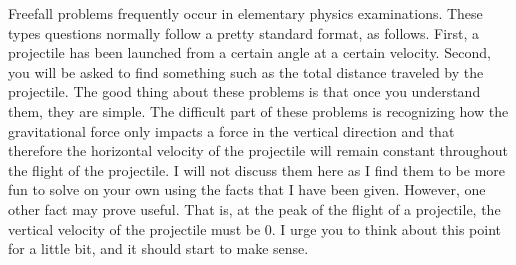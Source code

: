 Freefall problems frequently occur in elementary physics examinations. These types questions normally follow a pretty standard format, as follows. First, a projectile has been launched from a certain angle at a certain velocity. Second, you will be asked to find something such as the total distance traveled by the projectile. The good thing about these problems is that once you understand them, they are simple. The difficult part of these problems is recognizing how the gravitational force only impacts a force in the vertical direction and that therefore the horizontal velocity of the projectile will remain constant throughout the flight of the projectile. I will not discuss them here as I find them to be more fun to solve on your own using the facts that I have been given. However, one other fact may prove useful. That is, at the peak of the flight of a projectile, the vertical velocity of the projectile must be 0. I urge you to think about this point for a little bit, and it should start to make sense. 
\newline
\newline
\newline
\newline
{}
\newline
\newline
\newline
\newline